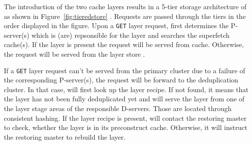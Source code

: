 
The introduction of the two cache layers results in a 5-tier storage architecture of
\sysname as shown in Figure~\ref{fig:tieredstore} . Requests are passed through the
tiers in the order displayed in the figure. Upon a \texttt{GET} layer request,
\sysname first determines the P-server(s) which is (are) repsonsible for the layer
and searches the superfetch cache(s).
If the layer is present the request will be served from cache.
Otherwise, the request will be served from the layer store .

If a \texttt{GET} layer request can't be served from the primary cluster
due to a failure of the corresponding P-server(s),
the request will be forward to the deduplication cluster.
In that case, \sysname will first look up the layer recipe. If not found, it means that
the layer has not been fully deduplicated yet and \sysname will serve the layer
from one of the layer stage areas of the responsible D-servers. Those are located
through consistent hashing.
If the layer recipe is present, \sysname will contact the restoring master to
check, whether the layer is in its preconstruct cache. Otherwise, it will
instruct the restoring master to rebuild the layer.


